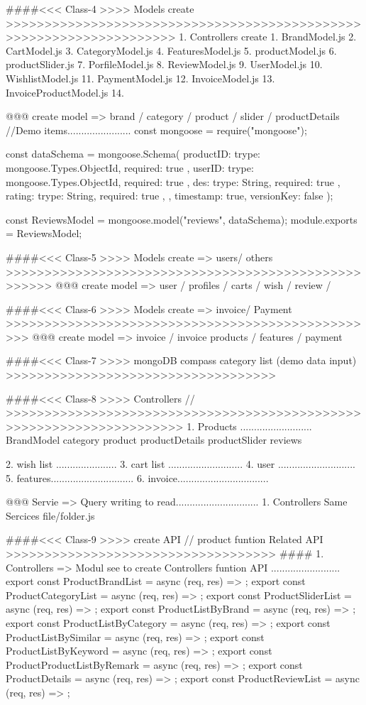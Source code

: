 ####<<< Class-4 >>>> Models create >>>>>>>>>>>>>>>>>>>>>>>>>>>>>>>>>>>>>>>>>>>>>>>>>>>>>>>>>>>>>>>>>>>>
1. Controllers create 
   1. BrandModel.js
   2. CartModel.js
   3. CategoryModel.js
   4. FeaturesModel.js
   5. productModel.js
   6. productSlider.js
   7. PorfileModel.js
   8. ReviewModel.js
   9. UserModel.js
   10. WishlistModel.js
   11. PaymentModel.js
   12. InvoiceModel.js
   13. InvoiceProductModel.js
   14. 

@@@ create model => brand / category / product / slider / productDetails
//Demo items.......................
const mongoose = require("mongoose");

const dataSchema = mongoose.Schema(
  {
    productID: { trype: mongoose.Types.ObjectId, required: true },
    userID: { trype: mongoose.Types.ObjectId, required: true },
    des: { trype: String, required: true },
    rating: { trype: String, required: true },
  },
  { timestamp: true, versionKey: false }
);

const ReviewsModel = mongoose.model("reviews", dataSchema);
module.exports = ReviewsModel;


####<<< Class-5 >>>> Models create => users/ others >>>>>>>>>>>>>>>>>>>>>>>>>>>>>>>>>>>>>>>>>>>>>>>>>>>>
@@@ create model => user / profiles / carts / wish / review / 

####<<< Class-6 >>>> Models create => invoice/ Payment >>>>>>>>>>>>>>>>>>>>>>>>>>>>>>>>>>>>>>>>>>>>>>>>>
@@@ create model => invoice / invoice products / features / payment

####<<< Class-7 >>>> mongoDB compass category list (demo data input) >>>>>>>>>>>>>>>>>>>>>>>>>>>>>>>>>>>

####<<< Class-8 >>>> Controllers // >>>>>>>>>>>>>>>>>>>>>>>>>>>>>>>>>>>>>>>>>>>>>>>>>>>>>>>>>>>>>>>>>>>>>
      1. Products ..........................
          BrandModel
          category
          product
          productDetails
          productSlider
          reviews
      
      2. wish list ......................
      3. cart list ...........................
      4. user ............................
      5. features..............................
      6. invoice.................................

@@@ Servie => Query writing to read..............................
 1. Controllers Same Sercices file/folder.js  

 ####<<< Class-9 >>>> create API // product funtion Related API >>>>>>>>>>>>>>>>>>>>>>>>>>>>>>>>>>>
 #### 1.  Controllers => Modul see to create Controllers funtion API .........................
       export const ProductBrandList = async (req, res) => {};
       export const ProductCategoryList = async (req, res) => {};
       export const ProductSliderList = async (req, res) => {};
       export const ProductListByBrand = async (req, res) => {};
       export const ProductListByCategory = async (req, res) => {};
       export const ProductListBySimilar = async (req, res) => {};
       export const ProductListByKeyword = async (req, res) => {};
       export const ProductProductListByRemark = async (req, res) => {};
       export const ProductDetails = async (req, res) => {};
       export const ProductReviewList = async (req, res) => {};

